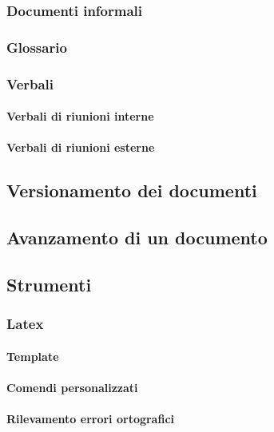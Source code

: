 \documentclass[../NormeProgetto.tex]{subfiles}
\begin{document}
		\subsubsection{Documenti informali}
		\subsubsection{Glossario}
		\subsubsection{Verbali}
			\paragraph{Verbali di riunioni interne}
			\paragraph{Verbali di riunioni esterne}
	\subsection{Versionamento dei documenti} \label{sec:Versionamento dei documenti}
	\subsection{Avanzamento di un documento} 
	\subsection{Strumenti}
		\subsubsection{Latex}
			\paragraph{Template}
			\paragraph{Comendi personalizzati}
			\paragraph{Rilevamento errori ortografici}
			
			
			
\end{document}
